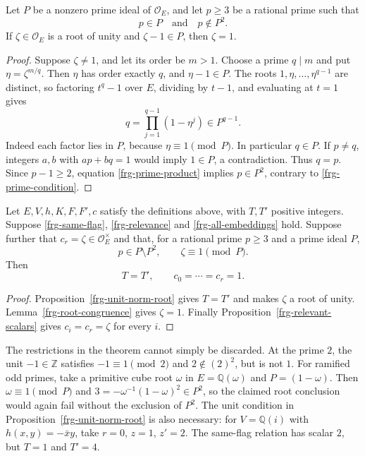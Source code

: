 \begin{lemma}\label{frg-root-congruence}
Let $P$ be a nonzero prime ideal of $\mathcal O_E$, and
let $p\ge3$ be a rational prime such that
\begin{equation}\label{frg-prime-condition}
                         p\in P\quad\text{and}\quad p\notin P^2.
\end{equation}
If $\zeta\in\mathcal O_E$ is a root of unity and
$\zeta-1\in P$, then $\zeta=1$.
\end{lemma}
\begin{proof}
Suppose $\zeta\ne1$, and let its order be $m>1$.
Choose a prime $q\mid m$ and put $\eta=\zeta^{m/q}$.
Then $\eta$ has order exactly $q$, and $\eta-1\in P$.
The roots $1,\eta,\ldots,\eta^{q-1}$ are distinct, so
factoring $t^q-1$ over $E$, dividing by $t-1$, and
evaluating at $t=1$ gives
\begin{equation}\label{frg-prime-product}
                     q=\prod_{j=1}^{q-1}(1-\eta^j)\in P^{q-1}.
\end{equation}
Indeed each factor lies in $P$, because $\eta\equiv1\pmod P$.
In particular $q\in P$. If $p\ne q$, integers $a,b$
with $ap+bq=1$ would imply $1\in P$, a contradiction.
Thus $q=p$. Since $p-1\ge2$, equation
\eqref{frg-prime-product} implies $p\in P^2$, contrary
to \eqref{frg-prime-condition}.
\end{proof}

\begin{theorem}
\label{frg-identity-cell}
Let $E,V,h,K,F,F',c$ satisfy the definitions above, with
$T,T'$ positive integers. Suppose
\eqref{frg-same-flag}, \eqref{frg-relevance} and
\eqref{frg-all-embeddings} hold. Suppose further that
$c_r=\zeta\in\mathcal O_E^\times$ and that, for a rational
prime $p\ge3$ and a prime ideal $P$,
\[
                         p\in P\setminus P^2,
                         \qquad\zeta\equiv1\pmod P.
\]
Then
\begin{equation}\label{frg-identity-conclusion}
                         T=T',\qquad c_0=\cdots=c_r=1.
\end{equation}
\end{theorem}
\begin{proof}
Proposition~\ref{frg-unit-norm-root} gives $T=T'$ and
makes $\zeta$ a root of unity. Lemma~\ref{frg-root-congruence}
gives $\zeta=1$. Finally Proposition~\ref{frg-relevant-scalars}
gives $c_i=c_r=\zeta$ for every $i$.
\end{proof}

The restrictions in the theorem cannot simply be discarded.
At the prime $2$, the unit $-1\in\mathbb Z$ satisfies
$-1\equiv1\pmod2$ and $2\notin(2)^2$, but is not $1$.
For ramified odd primes, take a primitive cube root $\omega$
in $E=\mathbb Q(\omega)$ and $P=(1-\omega)$.
Then $\omega\equiv1\pmod P$ and
$3=-\omega^{-1}(1-\omega)^2\in P^2$, so the claimed
root conclusion would again fail without the exclusion of
$P^2$. The unit condition in Proposition~\ref{frg-unit-norm-root}
is also necessary: for $V=\mathbb Q(i)$ with
$h(x,y)=-\bar x y$, take $r=0$, $z=1$, $z'=2$.
The same-flag relation has scalar $2$, but $T=1$ and $T'=4$.


